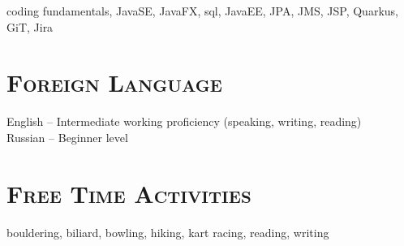 \documentclass{article}
\begin{document}
coding fundamentals, JavaSE, JavaFX, sql, JavaEE, JPA, JMS, JSP,  Quarkus, GiT, Jira

\section{\textsc{Foreign Language}}

English  -- Intermediate working proficiency (speaking, writing, reading)\\
Russian -- Beginner level

\section{\textsc{Free Time Activities}}

bouldering, biliard, bowling, hiking, kart racing, reading, writing
\end{document}
